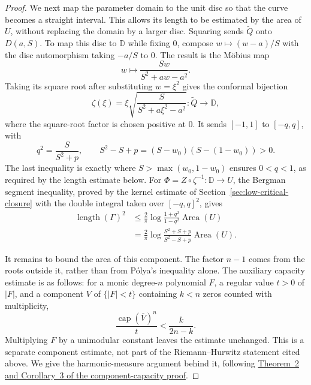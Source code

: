 \documentclass[11pt]{article}
\begin{document}
\begin{proof}
We next map the parameter domain to the unit disc so that the curve
becomes a straight interval. This allows its length to be estimated by
the area of $U$, without replacing the domain by a larger disc.
Squaring sends $\widetilde Q$ onto $D(a,S)$. To map this disc to
$\mathbb D$ while fixing $0$, compose $w\mapsto(w-a)/S$ with the disc
automorphism taking $-a/S$ to $0$. The result is the M\"obius map
\[
 w\longmapsto\frac{Sw}{S^2+aw-a^2}.
\]
Taking its square root after substituting $w=\xi^2$ gives the conformal
bijection
\[
 \zeta(\xi)=\xi\sqrt{\frac{S}{S^2+a\xi^2-a^2}}
     :\widetilde Q\longrightarrow\mathbb D,
\]
where the square-root factor is chosen positive at $0$. It sends
$[-1,1]$ to $[-q,q]$, with
\[
 q^2=\frac{S}{S^2+p},\qquad
 S^2-S+p=(S-w_0)(S-(1-w_0))>0.
\]
The last inequality is exactly where $S>\max(w_0,1-w_0)$ ensures
$0<q<1$, as required by the length estimate below.
For $\Phi=Z\circ\zeta^{-1}:\mathbb D\to U$, the Bergman segment inequality,
proved by the kernel estimate of Section~\ref{sec:low-critical-closure} with
the double integral taken over $[-q,q]^2$, gives
\begin{align*}
 \operatorname{length}(\Gamma)^2
 &\le \frac2\pi\log\frac{1+q^2}{1-q^2}
       \operatorname{Area}(U)\\
 &=\frac2\pi\log\frac{S^2+S+p}{S^2-S+p}
       \operatorname{Area}(U).                       \tag{7}
\end{align*}

It remains to bound the area of this component. The factor $n-1$ comes
from the roots outside it, rather than from P\'olya's inequality alone.
The auxiliary capacity estimate is as follows: for a monic degree-$n$
polynomial $F$, a regular value $t>0$ of $|F|$, and a component $V$ of
$\{|F|<t\}$ containing $k<n$ zeros counted with multiplicity,
\[
 \frac{\operatorname{cap}(\overline V)^n}{t}<\frac{k}{2n-k}.
\]
Multiplying $F$ by a unimodular constant leaves the estimate unchanged.
This is a separate component estimate, not part of the
Riemann--Hurwitz statement cited above. We give the harmonic-measure
argument behind it, following
\href{https://github.com/wcook04/plectis-erdos/blob/8efbccc235df64a38d83f5dc7b1949e2ad18270d/research_corpus/Erdos1041/problem/ExteriorBlaschkeFibreCapacityGap.md}{Theorem~2 and Corollary~3 of the component-capacity proof}.


\end{proof}
\end{document}
